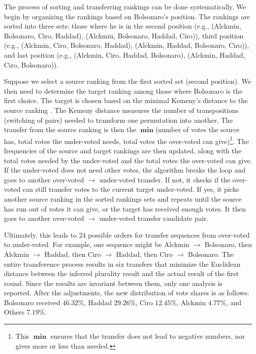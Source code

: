 \documentclass[hidelinks,11pt]{article} \usepackage[utf8]{inputenc}
\begin{document}
The process of sorting and transferring rankings can be done systematically. We begin by organizing the rankings based on Bolsonaro's position. The rankings are sorted into three sets: those where he is in the
second position (e.g., (Alckmin, Bolsonaro, Ciro, Haddad), (Alckmin, Bolsonaro, Haddad, Ciro)), third position (e.g., (Alckmin, Ciro, Bolsonaro, Haddad), (Alckmin, Haddad, Bolsonaro, Ciro)), and last position (e.g., (Alckmin, Ciro, Haddad, Bolsonaro), (Alckmin, Haddad, Ciro, Bolsonaro)).

Suppose we select a source ranking from the first sorted set (second position). We then need to determine the target ranking among those where Bolsonaro is the first choice. The target is chosen based on the minimal Kemeny's distance to the
source ranking \parencite{nurmi2002voting}. The Kemeny distance measures the
number of transpositions (switching of pairs) needed to transform one permutation into another. The transfer from the source ranking is then the \(\operatorname{\mathbf{min}}\)(number of votes the source has, total votes the under-voted needs, total votes the over-voted can give)\footnote{This \(\operatorname{\mathbf{min}}\) ensures that the transfer does not lead to negative numbers, nor gives more or less than needed.}. The frequencies of the source and target rankings are then updated, along with the total votes needed by the under-voted and the total votes the over-voted can give. If the under-voted does not need other votes, the algorithm breaks the loop and goes to another over-voted \(\to\) under-voted transfer. If not, it checks if the over-voted can still transfer votes to the current target under-voted. If yes, it picks another source ranking in the sorted rankings sets and repeats until the source has run out of votes it can give, or the target has received enough votes. It then goes to another over-voted \(\to\) under-voted transfer candidate pair.

Ultimately, this leads to 24 possible orders for transfer sequences from over-voted to under-voted. For example, one sequence might be Alckmin \(\to\) Bolsonaro, then Alckmin \(\to\) Haddad, then Ciro \(\to\) Haddad, then Ciro \(\to\) Bolsonaro. The entire transference process results in six transfers that minimize the Euclidean distance between the inferred plurality result and the actual result of the first round. Since the results are invariant between them, only one analysis is reported. After the adjustments, the new distribution of vote shares is as follows: Bolsonaro received \(46.32\%\), Haddad \(29.26\%\), Ciro \(12.45\%\), Alckmin \(4.77\%\), and Others \(7.19\%\).
\end{document}
